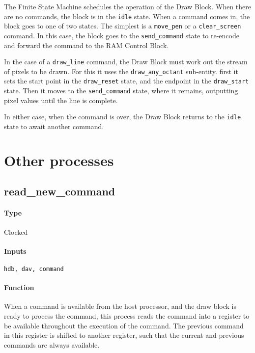 \documentclass[12pt]{article}
\begin{document}

The Finite State Machine schedules the operation of the Draw
Block. When there are no commands, the block is in the \verb|idle|
state. When a command comes in, the block goes to one of two
states. The simplest is a \verb|move_pen| or a \verb|clear_screen|
command. In this case, the block goes to the \verb|send_command| state
to re-encode and forward the command to the RAM Control Block.

In the case of a \verb|draw_line| command, the Draw Block must work
out the stream of pixels to be drawn. For this it uses the
\verb|draw_any_octant| sub-entity. first it sets the start point in
the \verb|draw_reset| state, and the endpoint in the \verb|draw_start|
state. Then it moves to the \verb|send_command| state, where it
remains, outputting pixel values until the line is complete.

In either case, when the command is over, the Draw Block returns to
the \verb|idle| state to await another command.

\section{Other processes}
\subsection{read\_new\_command}
\paragraph{Type}
Clocked
\paragraph{Inputs}
\verb|hdb, dav, command|
\paragraph{Function}
When a command is available from the host processor, and the draw
block is ready to process the command, this process reads the command
into a register to be available throughout the execution of the
command. The previous command in this register is shifted to another
register, such that the current and previous commands are always
available.
\end{document}
